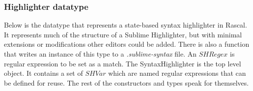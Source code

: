 \pagebreak
\subsubsection{Highlighter datatype} \label{sec:RascalHighlighter}
Below is the datatype that represents a state-based syntax highlighter in Rascal. It represents much of the structure of a Sublime Highlighter, but with minimal extensions or modifications other editors could be added. There is also a function that writes an instance of this type to a \emph{.sublime-syntax} file. An $SHRegex$ is regular expression to be set as a match. The SyntaxHighlighter is the top level object. It contains a set of $SHVar$ which are named regular expressions that can be defined for reuse. The rest of the constructors and types speak for themselves.
